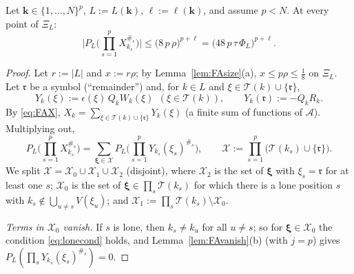 \begin{lemma}\label{lem:FAtuple}
Let $\mathbf k\in\{1,\dots,N\}^p$, $L:=L(\mathbf k)$, $\ell:=\ell(\mathbf k)$, and assume $p<N$. At every point of $\Xi_L$:
\begin{equation}\label{eq:FAtuple}
 \Big|P_L\Big(\prod_{s=1}^pX_{k_s}^{\#_s}\Big)\Big|\le\big(8\,p\,\rho\big)^{p+\ell}=\big(48\,p\,\tau\,\Phi_L\big)^{p+\ell}.
\end{equation}
\end{lemma}
\begin{proof}
Let $r:=|L|$ and $x:=r\rho$; by Lemma~\ref{lem:FAsize}(a), $x\le p\rho\le\frac18$ on $\Xi_L$. Let $\mathfrak r$ be a symbol (``remainder'') and, for $k\in L$ and $\xi\in\mathcal T(k)\cup\{\mathfrak r\}$,
\[
 Y_k(\xi):=\epsilon(\xi)\,Q_kW_k(\xi)\ \ (\xi\in\mathcal T(k)),\qquad Y_k(\mathfrak r):=-Q_kR_k .
\]
By \eqref{eq:FAX}, $X_k=\sum_{\xi\in\mathcal T(k)\cup\{\mathfrak r\}}Y_k(\xi)$ (a finite sum of functions of $\mathcal A$). Multiplying out,
\begin{equation}\label{eq:tuple1}
 P_L\Big(\prod_{s=1}^pX_{k_s}^{\#_s}\Big)=\sum_{\boldsymbol\xi\in\mathcal X}P_L\Big(\prod_{s=1}^pY_{k_s}(\xi_s)^{\#_s}\Big),\qquad\mathcal X:=\prod_{s=1}^p\big(\mathcal T(k_s)\cup\{\mathfrak r\}\big).
\end{equation}
We split $\mathcal X=\mathcal X_0\cup\mathcal X_1\cup\mathcal X_2$ (disjoint), where $\mathcal X_2$ is the set of $\boldsymbol\xi$ with $\xi_s=\mathfrak r$ for at least one $s$; $\mathcal X_0$ is the set of $\boldsymbol\xi\in\prod_s\mathcal T(k_s)$ for which there is a lone position $s$ with
$k_s\notin\bigcup_{u\ne s}V(\xi_u)$; and $\mathcal X_1:=\prod_s\mathcal T(k_s)\setminus\mathcal X_0$.

\emph{Terms in $\mathcal X_0$ vanish.} If $s$ is lone, then $k_s\ne k_u$ for all $u\ne s$; so for $\boldsymbol\xi\in\mathcal X_0$ the condition \eqref{eq:lonecond} holds, and Lemma~\ref{lem:FAvanish}(b) (with $j=p$) gives $P_L(\prod_sY_{k_s}(\xi_s)^{\#_s})=0$.


\end{proof}
